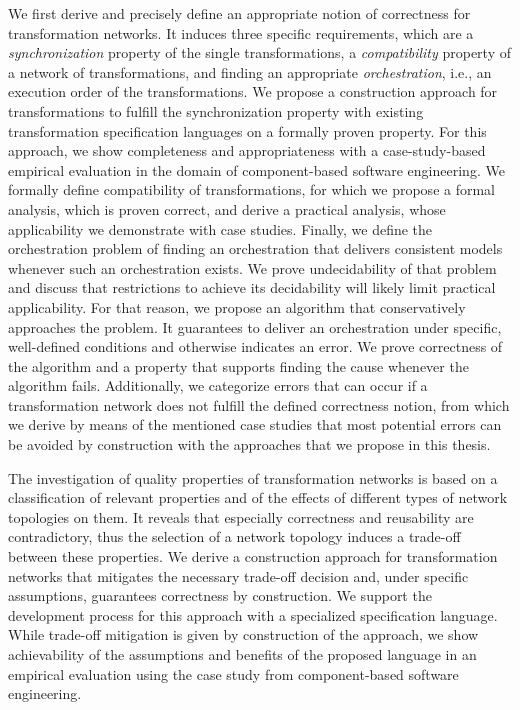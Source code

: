 We first derive and precisely define an appropriate notion of correctness for transformation networks.
It induces three specific requirements, which are a \emph{synchronization} property of the single transformations, a \emph{compatibility} property of a network of transformations, and finding an appropriate \emph{orchestration}, i.e., an execution order of the transformations.
We propose a construction approach for transformations to fulfill the synchronization property with existing transformation specification languages on a formally proven property.
For this approach, we show completeness and appropriateness with a case-study-based empirical evaluation in the domain of component-based software engineering.
We formally define compatibility of transformations, for which we propose a formal analysis, which is proven correct, and derive a practical analysis, whose applicability we demonstrate with case studies.
Finally, we define the orchestration problem of finding an orchestration that delivers consistent models whenever such an orchestration exists.
We prove undecidability of that problem and discuss that restrictions to achieve its decidability will likely limit practical applicability.
For that reason, we propose an algorithm that conservatively approaches the problem.
It guarantees to deliver an orchestration under specific, well-defined conditions and otherwise indicates an error.
We prove correctness of the algorithm and a property that supports finding the cause whenever the algorithm fails.
Additionally, we categorize errors that can occur if a transformation network does not fulfill the defined correctness notion, from which we derive by means of the mentioned case studies that most potential errors can be avoided by construction with the approaches that we propose in this thesis.

The investigation of quality properties of transformation networks is based on a classification of relevant properties and of the effects of different types of network topologies on them.
It reveals that especially correctness and reusability are contradictory, thus the selection of a network topology induces a trade-off between these properties.
We derive a construction approach for transformation networks that mitigates the necessary trade-off decision and, under specific assumptions, guarantees correctness by construction.
We support the development process for this approach with a specialized specification language.
While trade-off mitigation is given by construction of the approach, we show achievability of the assumptions and benefits of the proposed language in an empirical evaluation using the case study from component-based software engineering.

